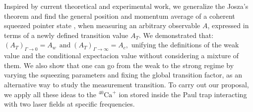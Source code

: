 \documentclass[aps,pra,preprint,superscriptaddress, showpacs]{revtex4-2}
\begin{document}


Inspired by current theoretical and experimental work, we generalize the Josza's theorem and find the general position and momentum average of a coherent squeezed pointer state \cite{caves1980quantum,caves1981quantum}, when measuring an arbitrary observable $A$, expressed in terms of a newly defined transition value $A_{T}$. We demonstrated that:
$
\left(A_{T}\right)_{\Gamma \rightarrow 0}=A_{w}\, \; \text{and}\; \left(A_{T}\right)_{\Gamma \rightarrow \infty}=A_{c}, 
$
unifying the definitions of the weak value and the conditional expectacion value without considering a mixture of them. We also show that one can go from the weak to the strong regime by varying the squeezing parameters and fixing the global transition factor, as an alternative way to study the measurement transition. To carry out our proposal, we apply all these ideas to the ${}^{40}\text{Ca}^{+}$ ion stored inside the Paul trap interacting with two laser fields at specific frequencies. 

\end{document}
